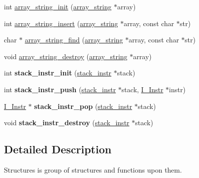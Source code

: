\begin{DoxyCompactItemize}
\item 
int \hyperlink{group__structures_ga003cb42993ea69300701cbbd424ec9d7}{array\+\_\+string\+\_\+init} (\hyperlink{structarray__string}{array\+\_\+string} $\ast$array)
\item 
int \hyperlink{group__structures_ga7d9cf58a02819262c3b5013a0123407a}{array\+\_\+string\+\_\+insert} (\hyperlink{structarray__string}{array\+\_\+string} $\ast$array, const char $\ast$str)
\item 
char $\ast$ \hyperlink{group__structures_ga2f60bd4192abb5c7055bd60d27e833f1}{array\+\_\+string\+\_\+find} (\hyperlink{structarray__string}{array\+\_\+string} $\ast$array, const char $\ast$str)
\item 
void \hyperlink{group__structures_gafa9efea7fd8eca46fb047e80200447c5}{array\+\_\+string\+\_\+destroy} (\hyperlink{structarray__string}{array\+\_\+string} $\ast$array)
\item 
\hypertarget{group__structures_ga3d80fa25c9bfc5c70b1e44df07d8855d}{}int {\bfseries stack\+\_\+instr\+\_\+init} (\hyperlink{structstack__instr}{stack\+\_\+instr} $\ast$stack)\label{group__structures_ga3d80fa25c9bfc5c70b1e44df07d8855d}

\item 
\hypertarget{group__structures_ga864541f1cb8efc46c86a9bc17389165a}{}int {\bfseries stack\+\_\+instr\+\_\+push} (\hyperlink{structstack__instr}{stack\+\_\+instr} $\ast$stack, \hyperlink{structI__Instr}{I\+\_\+\+Instr} $\ast$instr)\label{group__structures_ga864541f1cb8efc46c86a9bc17389165a}

\item 
\hypertarget{group__structures_gae6627e4630a7c9c1e9c3d3deb4b600e1}{}\hyperlink{structI__Instr}{I\+\_\+\+Instr} $\ast$ {\bfseries stack\+\_\+instr\+\_\+pop} (\hyperlink{structstack__instr}{stack\+\_\+instr} $\ast$stack)\label{group__structures_gae6627e4630a7c9c1e9c3d3deb4b600e1}

\item 
\hypertarget{group__structures_ga1708d1d64f1dfce8fa57d0c6e55bc03b}{}void {\bfseries stack\+\_\+instr\+\_\+destroy} (\hyperlink{structstack__instr}{stack\+\_\+instr} $\ast$stack)\label{group__structures_ga1708d1d64f1dfce8fa57d0c6e55bc03b}

\end{DoxyCompactItemize}


\subsection{Detailed Description}
Structures is group of structures and functions upon them. 

